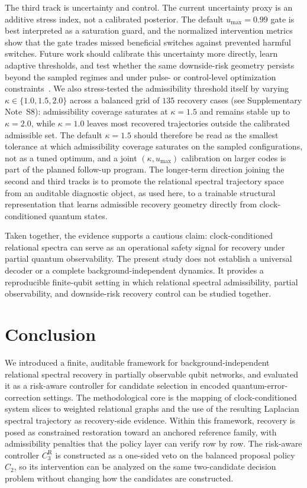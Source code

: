 \documentclass{iopjournal}
\begin{document}
The third track is uncertainty and control. The current uncertainty proxy is an
additive stress index, not a calibrated posterior. The default
$u_{\max}=0.99$ gate is best interpreted as a saturation guard, and the
normalized intervention metrics show that the gate trades missed beneficial
switches against prevented harmful switches. Future work should calibrate this
uncertainty more directly, learn adaptive thresholds, and test whether the same
downside-risk geometry persists beyond the sampled regimes and under pulse- or
control-level optimization constraints~\cite{Mohseni2021AdiabaticErrorSuppression,Lewis2026PulseQualityOptimisation}.
We also stress-tested the admissibility threshold itself by varying 
$\kappa\in\{1.0,1.5,2.0\}$ across a balanced grid of $135$ recovery cases 
(see Supplementary Note~S8): admissibility coverage saturates at 
$\kappa=1.5$ and remains stable up to $\kappa=2.0$, while $\kappa=1.0$ 
leaves most recovered trajectories outside the calibrated admissible set. 
The default $\kappa=1.5$ should therefore be read as the smallest tolerance 
at which admissibility coverage saturates on the sampled configurations, 
not as a tuned optimum, and a joint $(\kappa,u_{\max})$ calibration on 
larger codes is part of the planned follow-up program.
The longer-term direction joining the second and third tracks is to 
promote the relational spectral trajectory space from an auditable 
diagnostic object, as used here, to a trainable structural 
representation that learns admissible recovery geometry directly from 
clock-conditioned quantum states.

Taken together, the evidence supports a cautious claim: clock-conditioned
relational spectra can serve as an operational safety signal for recovery under
partial quantum observability. The present study does not establish a universal
decoder or a complete background-independent dynamics. It provides a reproducible
finite-qubit setting in which relational spectral admissibility, partial
observability, and downside-risk recovery control can be studied together.

\section{Conclusion}\label{sec:conclusion}

We introduced a finite, auditable framework for background-independent
relational spectral recovery in partially observable qubit networks, and
evaluated it as a risk-aware controller for candidate selection in
encoded quantum-error-correction settings. The methodological core is
the mapping of clock-conditioned system slices to weighted relational
graphs and the use of the resulting Laplacian spectral trajectory as
recovery-side evidence. Within this framework, recovery is posed as
constrained restoration toward an anchored reference family, with
admissibility penalties that the policy layer can verify row by row.
The risk-aware controller $C_3^{\mathrm R}$ is constructed as a
one-sided veto on the balanced proposal policy $C_2$, so its
intervention can be analyzed on the same two-candidate decision problem
without changing how the candidates are constructed. 
\end{document}

